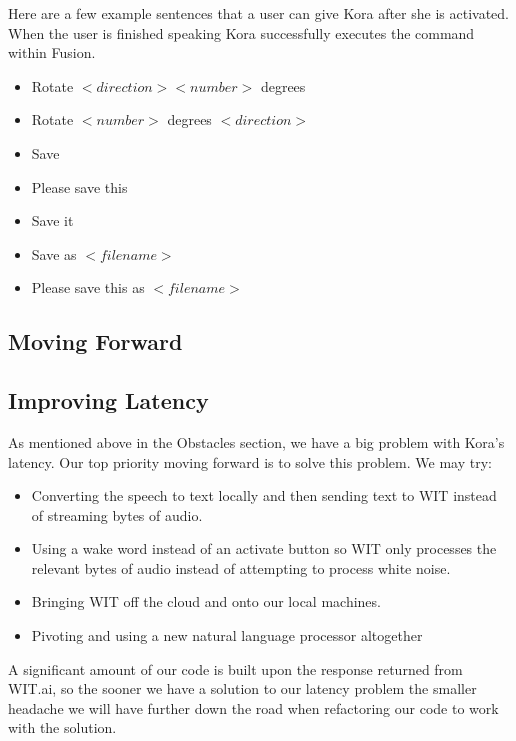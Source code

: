 \documentclass[onecolumn, draftclsnofoot,10pt, compsoc]{IEEEtran}
\begin{document}
			Here are a few example sentences that a user can give Kora after she is activated.
			When the user is finished speaking Kora successfully executes the command within Fusion.
			\begin{itemize}
				\item 
				Rotate $<direction> <number>$ degrees
				\item 
				Rotate $<number>$ degrees $<direction>$

				\item 
				Save
				
				\item 
				Please save this
				
				\item
				Save it

				\item 
				Save as $<file name>$
				
				\item 
				Please save this as $<file name>$
			\end{itemize}
		
		
	\subsection{Moving Forward}
		\subsection{Improving Latency}
			As mentioned above in the Obstacles section, we have a big problem with Kora's latency.
			Our top priority moving forward is to solve this problem.
			We may try:
			\begin{itemize}
				\item
				Converting the speech to text locally and then sending text to WIT instead of streaming bytes of audio.
				
				\item
				Using a wake word instead of an activate button so WIT only processes the relevant bytes of audio instead of attempting to process white noise.
				
				\item
				Bringing WIT off the cloud and onto our local machines.
				
				\item
				Pivoting and using a new natural language processor altogether
			\end{itemize}
			A significant amount of our code is built upon the response returned from WIT.ai, so the sooner we have a solution to our latency problem the smaller headache we will have further down the road when refactoring our code to work with the solution.
		
\end{document}
